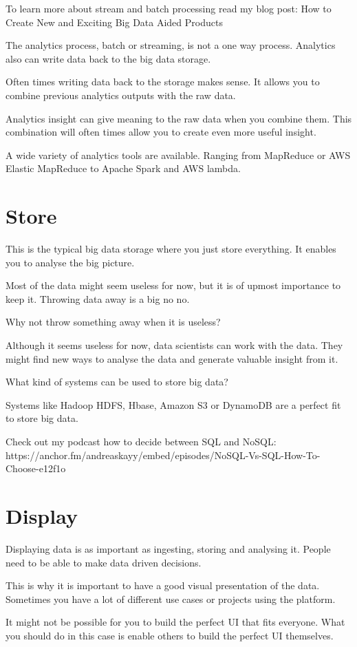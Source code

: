 \documentclass[12pt, numbers=noenddot]{scrreprt} %
\begin{document}
To learn more about stream and batch processing read my blog post: How to Create New and Exciting Big Data Aided Products

The analytics process, batch or streaming, is not a one way process. Analytics also can write data back to the big data storage.

Often times writing data back to the storage makes sense. It allows you to combine previous analytics outputs with the raw data.

Analytics insight can give meaning to the raw data when you combine them. This combination will often times allow you to create even more useful insight.

A wide variety of analytics tools are available. Ranging from MapReduce or AWS Elastic MapReduce to Apache Spark and AWS lambda.

\section{Store}
This is the typical big data storage where you just store everything. It enables you to analyse the big picture.

Most of the data might seem useless for now, but it is of upmost importance to keep it. Throwing data away is a big no no.

Why not throw something away when it is useless?

Although it seems useless for now, data scientists can work with the data. They might find new ways to analyse the data and generate valuable insight from it.

What kind of systems can be used to store big data?

Systems like Hadoop HDFS, Hbase, Amazon S3 or DynamoDB are a perfect fit to store big data.

Check out my podcast how to decide between SQL and NoSQL: https://anchor.fm/andreaskayy/embed/episodes/NoSQL-Vs-SQL-How-To-Choose-e12f1o

\section{Display}
Displaying data is as important as ingesting, storing and analysing it. People need to be able to make data driven decisions.

This is why it is important to have a good visual presentation of the data. Sometimes you have a lot of different use cases or projects using the platform.

It might not be possible for you to build the perfect UI that fits everyone. What you should do in this case is enable others to build the perfect UI themselves.
\end{document}
